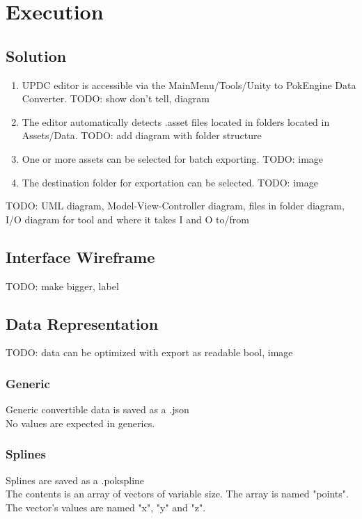 \documentclass[12pt,a4paper]{article}
\begin{document}
\section{Execution}
\subsection{Solution}
\begin{enumerate}
	\item UPDC editor is accessible via the MainMenu/Tools/Unity to PokEngine Data Converter. TODO: show don't tell, diagram
	\item The editor automatically detects .asset files located in folders located in Assets/Data. TODO: add diagram with folder structure
	\item One or more assets can be selected for batch exporting. TODO: image
	\item The destination folder for exportation can be selected. TODO: image
\end{enumerate}
TODO: UML diagram, Model-View-Controller diagram, files in folder diagram, I/O diagram for tool and where it takes I and O to/from

\subsection{Interface Wireframe}
TODO: make bigger, label
\begin{figure} [h]
\end{figure}

\subsection{Data Representation}
TODO: data can be optimized with export as readable bool, image
\subsubsection{Generic}
Generic convertible data is saved as a .json\\ No values are expected in generics.
\subsubsection{Splines}
Splines are saved as a .pokspline\\ The contents is an array of vectors of variable size. The array is named "points". The vector's values are named "x", "y" and "z".
\begin{figure}[h]
\end{figure}
\end{document}
